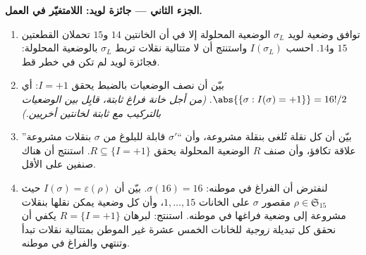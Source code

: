 \begin{problem}
\medskip
\noindent\textbf{الجزء الثاني --- جائزة لويد: اللامتغيّر في
العمل.}
\begin{enumerate}[resume]
  \item توافق وضعية لويد $\sigma_L$ الوضعية المحلولة
        إلا في أن الخانتين $14$ و$15$ تحملان القطعتين $15$ و$14$.
        احسب $I(\sigma_L)$ واستنتج أن لا متتالية نقلات
        تربط $\sigma_L$ بالوضعية المحلولة:
        فجائزة لويد لم تكن في خطر قط.
  \item بيّن أن نصف الوضعيات بالضبط يحقق $I =
        +1$: أي $\abs{\{\sigma : I(\sigma) = +1\}} = 16!/2$.
        \emph{(من أجل خانة فراغ ثابتة، قابِل بين الوضعيات
        بالتركيب مع  ثابتة لخانتين أخريين.)}
  \item بيّن أن كل نقلة تُلغى بنقلة مشروعة، وأن ``$\sigma'$ قابلة
        للبلوغ من $\sigma$ بنقلات مشروعة'' علاقة تكافؤ، وأن
        صنف $R$ الوضعية المحلولة يحقق $R \subseteq \{I = +1\}$.
        استنتج أن هناك صنفين على الأقل.
  \item لنفترض أن الفراغ في موطنه: $\sigma(16) = 16$. بيّن أن
        $I(\sigma) = \varepsilon(\rho)$ حيث $\rho \in
        \mathfrak{S}_{15}$ مقصور $\sigma$ على
        الخانات $1, \dots, 15$، وأن كل وضعية يمكن
        نقلها بنقلات مشروعة إلى وضعية فراغها في موطنه.
        استنتج: لبرهان $R = \{I = +1\}$ يكفي أن نحقق
        كل تبديلة \emph{زوجية} للخانات الخمس عشرة غير الموطن
        بمتتالية نقلات تبدأ وتنتهي والفراغ في موطنه.
\end{enumerate}


\end{problem}
